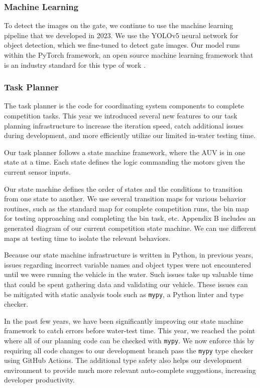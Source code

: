 \documentclass[conference]{IEEEtran}
\begin{document}
\subsubsection{Machine Learning}
\label{sssec:ml_flow}
To detect the images on the gate, we continue to use the machine learning pipeline that we developed in 2023. We use the YOLOv5 neural network \cite{b3} for object detection, which we fine-tuned to detect gate images. Our model runs within the PyTorch framework, an open source machine learning framework that is an industry standard for this type of work \cite{b4}. 

\subsubsection{Task Planner}
\label{sssec:task_planner}
The task planner is the code for coordinating system components to complete competition tasks. This year we introduced several new features to our task planning infrastructure to increase the iteration speed, catch additional issues during development, and more efficiently utilize our limited in-water testing time.

Our task planner follows a state machine framework, where the AUV is in one state at a time. Each state defines the logic commanding the motors given the current sensor inputs.

Our state machine defines the order of states and the conditions to transition from one state to another. We use several transition maps for various behavior routines, such as the standard map for complete competition runs, the bin map for testing approaching and completing the bin task, etc. Appendix B includes an generated diagram of our current competition state machine. We can use different maps at testing time to isolate the relevant behaviors.

Because our state machine infrastructure is written in Python, in previous years, issues regarding incorrect variable names and object types were not encountered until we were running the vehicle in the water. Such issues take up valuable time that could be spent gathering data and validating our vehicle. These issues can be mitigated with static analysis tools such as \verb|mypy|, a Python linter and type checker.

In the past few years, we have been significantly improving our state machine framework to catch errors before water-test time. This year, we reached the point where all of our planning code can be checked with \verb|mypy|. We now enforce this by requiring all code changes to our development branch pass the \verb|mypy| type checker using GitHub Actions. The additional type safety also helps our development environment to provide much more relevant auto-complete suggestions, increasing developer productivity. 
\end{document}
